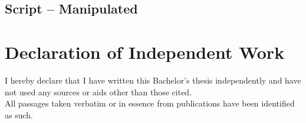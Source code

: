 \documentclass[twoside, 11pt]{article}
\begin{document}
\begin{appendices}
    \subsection{Script -- Manipulated} \label{sec:script-manipulated}
    
    \vp
    
    \vp
    
    \vp
    
    \vp
    
    \vp
    
    \vp
    
\end{appendices}
\vp


\section*{Declaration of Independent Work}

I hereby declare that I have written this Bachelor's thesis independently and have not used any sources or aids other than those cited. \\

\noindent All passages taken verbatim or in essence from publications have been identified as such. \\
\end{document}
